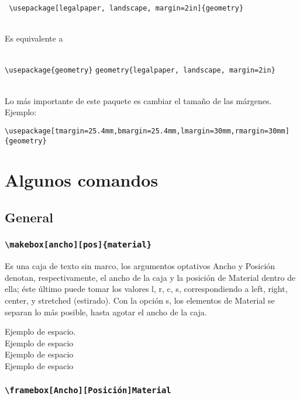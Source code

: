 \texttt{ \textbackslash usepackage[legalpaper, landscape, margin=2in]\{geometry\} } \\\

Es equivalente a\\\ 

\texttt{\textbackslash usepackage\{geometry\}}
\texttt{geometry\{legalpaper, landscape, margin=2in\}}\\\

Lo más importante de este paquete es cambiar el tamaño de las márgenes. Ejemplo:

\raggedright \texttt{\textbackslash usepackage[tmargin=25.4mm,bmargin=25.4mm,lmargin=30mm,rmargin=30mm]\{geometry\}}

\section{Algunos comandos}

\subsection{General}

\subsubsection{\texttt{\textbackslash makebox[ancho][pos]\{material\}}}

Es una caja de texto sin marco, los argumentos optativos Ancho y Posición denotan, respectivamente, el ancho de la caja y la posición de Material dentro de ella; éste último puede tomar los valores l, r, c, s, correspondiendo a left, right, center, y stretched (estirado). Con la opción s, los elementos de Material se separan lo más posible, hasta agotar el ancho de la caja.

Ejemplo de  espacio.\\
Ejemplo de  espacio\\
Ejemplo de  espacio\\
Ejemplo de  espacio\\



\subsubsection{\texttt{\textbackslash framebox[Ancho][Posición]{Material}}}

